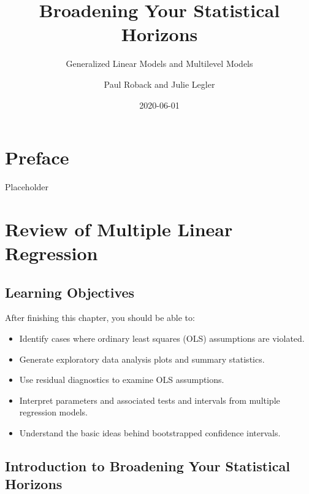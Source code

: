 \documentclass[
]{krantz}
\title{Broadening Your Statistical Horizons}
\subtitle{Generalized Linear Models and Multilevel Models}
\author{Paul Roback and Julie Legler}
\date{2020-06-01}
\providecommand{\tightlist}{%
  \setlength{\itemsep}{0pt}\setlength{\parskip}{0pt}}
\begin{document}
\maketitle


\thispagestyle{empty}

\setlength{\abovedisplayskip}{-5pt}
\setlength{\abovedisplayshortskip}{-5pt}

{
\hypersetup{linkcolor=}
\setcounter{tocdepth}{2}
\tableofcontents
}
\hypertarget{preface}{%
\chapter*{Preface}\label{preface}}


Placeholder

\hypertarget{ch-MLRreview}{%
\chapter{Review of Multiple Linear Regression}\label{ch-MLRreview}}

\hypertarget{learning-objectives}{%
\section{Learning Objectives}\label{learning-objectives}}

After finishing this chapter, you should be able to:

\begin{itemize}
\tightlist
\item
  Identify cases where ordinary least squares (OLS) assumptions are violated.
\item
  Generate exploratory data analysis plots and summary statistics.
\item
  Use residual diagnostics to examine OLS assumptions.
\item
  Interpret parameters and associated tests and intervals from multiple regression models.
\item
  Understand the basic ideas behind bootstrapped confidence intervals.
\end{itemize}

\hypertarget{introduction-to-broadening-your-statistical-horizons}{%
\section{Introduction to Broadening Your Statistical Horizons}\label{introduction-to-broadening-your-statistical-horizons}}
\end{document}
